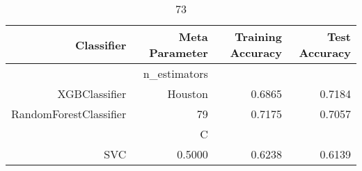 
\begin{table}[H]
    \caption{73}
    \centering
    \begin{tabular}{|r|r|r|r|}
        \hline
        Classifier &Meta Parameter &Training Accuracy
        &Test Accuracy\\
        \hline
        &n\_estimators &\multicolumn{2}{|r|}{}\\
        \hline
        XGBClassifier &Houston &0.6865 &0.7184\\
        \hline
        RandomForestClassifier &79 &0.7175 &0.7057\\
        \hline
        &C &\multicolumn{2}{|r|}{}\\
        \hline
        SVC &0.5000 &0.6238 &0.6139\\
        \hline
    \end{tabular}
\end{table}
